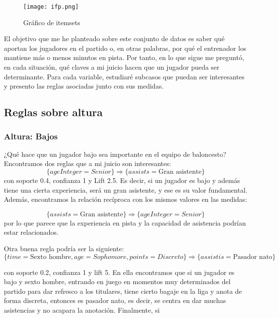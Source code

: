 \begin{figure}[H] %
	\centering
	\texttt{[image: ifp.png]}  %
	\caption{Gráfico de itemsets} 
	\label{fig:ifp}
\end{figure}

El objetivo que me he planteado sobre este conjunto de datos es saber qué aportan los jugadores en el partido o, en otras palabras, por qué el entrenador los mantiene más o menos minutos en pista. Por tanto, en lo que sigue me preguntó, en cada situación, qué claves a mi juicio hacen que un jugador pueda ser determinante. Para cada variable, estudiaré subcasos que puedan ser interesantes y presento las reglas asociadas junto con sus medidas.

\subsection{Reglas sobre altura}

\subsubsection{Altura: Bajos}
¿Qué hace que un jugador bajo sea importante en el equipo de baloncesto? Encontramos dos reglas que a mi juicio son interesantes:
$$\{ageInteger = Senior\} \Rightarrow \{assists = \text{Gran asistente}\}$$
con soporte 0.4, confianza 1 y Lift 2.5. Es decir, si un jugador es bajo y además tiene una cierta experiencia, será un gran asistente, y ese es su valor fundamental. Además, encontramos la relación recíproca con los mismos valores en las medidas:

$$\{assists = \text{Gran asistente}\} \Rightarrow \{ageInteger = Senior\}$$
por lo que parece que la experiencia en pista y la capacidad de asistencia podrían estar relacionados. 

Otra buena regla podría ser la siguiente:
$$\{time=\text{Sexto hombre}, age=Sophomore, points=Discreto\} \Rightarrow \{assistis = \text{Pasador nato}\}$$

con soporte 0.2, confianza 1 y lift 5. En ella encontramos que si un jugador es bajo y sexto hombre, entrando en juego en momentos muy determinados del partido para dar refresco a los titulares, tiene cierto bagaje en la liga y anota de forma discreta, entonces es pasador nato, es decir, se centra en dar muchas asistencias y no acapara la anotación. Finalmente, si 

